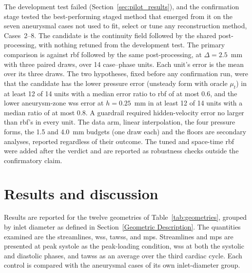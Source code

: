\documentclass[12pt,a4paper]{article}
\newcommand{\WSS}{\ac{wss}\xspace}
\newcommand{\TAWSS}{\ac{tawss}\xspace}
\newcommand{\MPS}{\ac{mps}\xspace}
\newcommand{\RBF}{\ac{rbf}\xspace}
\theoremstyle{definition}
\numberwithin{equation}{section}
\begin{document}
The development test failed (Section~\ref{sec:pilot_results}), and the confirmation stage tested the best-performing staged method that emerged from it on the seven aneurysmal cases not used to fit, select or tune any reconstruction method, Cases~2--8. The candidate is the continuity field followed by the shared post-processing, with nothing retuned from the development test. The primary comparison is against \RBF followed by the same post-processing, at $\Delta=2.5$~mm with three paired draws, over 14 case--phase units. Each unit's error is the mean over its three draws. The two hypotheses, fixed before any confirmation run, were that the candidate has the lower pressure error (unsteady form with oracle $\mu_t$) in at least 12 of 14 units with a median error ratio to \RBF of at most 0.6, and the lower aneurysm-zone \WSS error at $h=0.25$~mm in at least 12 of 14 units with a median ratio of at most 0.8. A guardrail required hidden-velocity error no larger than \RBF's in every unit. The data arm, linear interpolation, the four pressure forms, the 1.5 and 4.0~mm budgets (one draw each) and the floors are secondary analyses, reported regardless of their outcome. The tuned and space-time \RBF were added after the verdict and are reported as robustness checks outside the confirmatory claim.

\section{\label{Results and Discussions}Results and discussion}
\label{sec:cfd_results}
Results are reported for the twelve geometries of Table~\ref{tab:geometries},
grouped by inlet diameter as defined in Section~\ref{Geometric Description}. The
quantities examined are the streamlines, \WSS, \TAWSS, and \MPS. Streamlines and
\MPS are presented at peak systole as the peak-loading condition, \WSS at both
the systolic and diastolic phases, and \TAWSS as an average over the third
cardiac cycle. Each control is compared with the aneurysmal cases of its own
inlet-diameter group.
\end{document}
